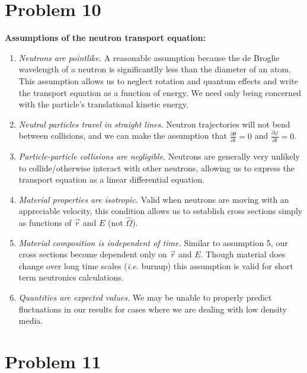 \documentclass{article}
\begin{document}

\section*{Problem 10}

\textbf{Assumptions of the neutron transport equation:}
\begin{enumerate}
	\item \textit{Neutrons are pointlike.} A reasonable assumption because the de Broglie wavelength of a neutron is significantlly less than the diameter of an atom. This assumption allows us to neglect rotation and quantum effects and write the transport equation as a function of energy. We need only being concerned with the particle's translational kinetic energy.
	\item \textit{Neutral particles travel in straight lines.} Neutron trajectories will not bend between collisions, and we can make the assumption that $\frac{\partial \theta}{\partial t} = 0$ and $\frac{\partial \varphi}{\partial t} = 0$.
	\item \textit{Particle-particle collisions are negligible.} Neutrons are generally very unlikely to collide/otherwise interact with other neutrons, allowing us to express the transport equation as a linear differential equation.
	\item \textit{Material properties are isotropic.} Valid when neutrons are moving with an appreciable velocity, this condition allows us to establish cross sections simply as functions of $\vec{r}$ and $E$ (not $\hat{\Omega}$).
	\item \textit{Material composition is independent of time.} Similar to assumption 5, our cross sections become dependent only on $\vec{r}$ and $E$. Though material does change over long time scales (\textit{i.e.} burnup) this assumption is valid for short term neutronics calculations.
	\item \textit{Quantities are expected values.} We may be unable to properly predict fluctuations in our results for cases where we are dealing with low density media.

\end{enumerate}




\section*{Problem 11}
\end{document}
